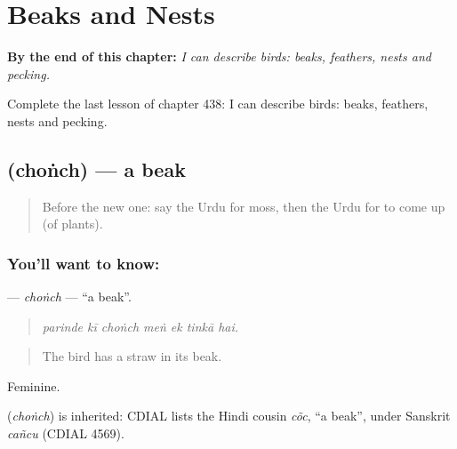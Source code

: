 
\chapter{Beaks and Nests}
\label{ch:ur-beaks-and-nests}

\begin{chapteropening}
\textbf{By the end of this chapter:} \emph{I can describe birds: beaks, feathers, nests and pecking.}

Complete the last lesson of chapter 438: I can describe birds: beaks, feathers, nests and pecking.
\end{chapteropening}

\section[\texorpdfstring{\ur{چونچ} (choṅch)}{چونچ (choṅch)}]{ (choṅch) — a beak}

\label{lesson:UR-C438-chonch}



\begin{quote}
Before the new one: say the Urdu for moss, then the Urdu for to come up (of plants).
\end{quote}

\subsection*{You'll want to know: }
\textbf{} — \emph{choṅch} — \textquotedblleft{}a beak\textquotedblright{}.

\begin{quote}
      
\end{quote}

\begin{quote}
\emph{parinde kī choṅch meṅ ek tinkā hai.}
\end{quote}

\begin{quote}
The bird has a straw in its beak.
\end{quote}

Feminine.

\begin{cousinweb}
\textbf{} (\emph{choṅch}) is inherited: CDIAL lists the Hindi cousin \emph{cõc}, \textquotedblleft{}a beak\textquotedblright{}, under Sanskrit \emph{cañcu} (CDIAL 4569).
\end{cousinweb}

